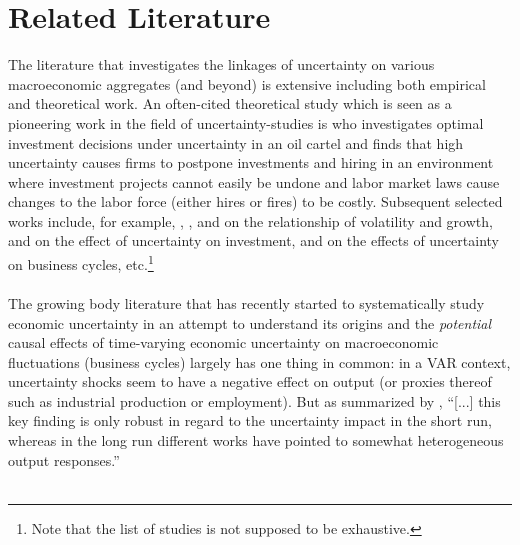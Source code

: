 \documentclass[a4paper,12pt,oneside,pointednumbers,bibtotoc,bigheadings,liststotoc]{scrbook}
\begin{document}
\chapter{Related Literature}
\label{UncertaintyandBusinessCyclesRelatedLiterature}
The literature that investigates the linkages of uncertainty on various macroeconomic aggregates (and beyond) is extensive including both empirical and theoretical work. An often-cited theoretical study which is seen as a pioneering work in the field of uncertainty-studies is \citet{bernanke:83} who investigates optimal investment decisions under uncertainty in an oil cartel and finds that high uncertainty causes firms to postpone investments and hiring in an environment where investment projects cannot easily be undone and labor market laws cause changes to the labor force (either hires or fires) to be costly. Subsequent selected works include, for example, \citet{rameyandramey:95}, \citet{aghionetal:05}, \citet{mills:00} and \citet{imbs:07} on the relationship of volatility and growth, \citet{leahyandwhited:96} and \citet{bloometal:07} on the effect of uncertainty on investment, \citet{barlevy:04} and \citet{gilchristandwilliams:05} on the effects of uncertainty on business cycles, etc.\footnote{Note that the list of studies is not supposed to be exhaustive.} \\
\\
The growing body literature that has recently started to systematically study economic uncertainty in an attempt to understand its origins and the \textit{potential} causal effects of time-varying economic uncertainty on macroeconomic fluctuations (business cycles) largely has one thing in common: in a VAR context, uncertainty shocks seem to have a negative effect on output (or proxies thereof such as industrial production or employment). But as summarized by \citet[p. 23]{bontempietal:16}, ``[...] this key finding is only robust in regard to the uncertainty impact in the short run, whereas in the long run different works have pointed to somewhat heterogeneous output responses.'' \\
\\
\end{document}
